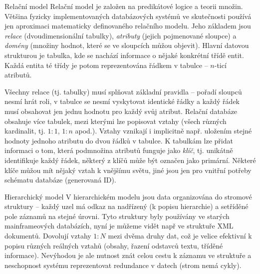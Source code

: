 \begin{obecne}{Relační model}
Relační model je založen na predikátové logice a teorii množin. Většina fyzicky implementovaných databázových systémů ve skutečnosti používá jen aproximaci matematicky definovaného relačního modelu. Jeho základem jsou \emph{relace} (dvoudimensionální tabulky), \emph{atributy} (jejich pojmenované sloupce) a \emph{domény} (množiny hodnot, které se ve sloupcích můžou objevit). Hlavní datovou strukturou je tabulka, kde se nachází informace o nějaké konkrétní  třídě entit. Každá entita té třídy je potom reprezentována řádkem v tabulce -- $n$-ticí atributů.

Všechny relace (tj. tabulky) musí splňovat základní pravidla -- pořadí sloupců nesmí hrát roli, v tabulce se nesmí vyskytovat identické řádky a každý řádek musí obsahovat jen jednu hodnotu pro každý svůj atribut. Relační databáze obsahuje více tabulek, mezi kterými lze popisovat vztahy (všech různých kardinalit, tj. $1:1$, $1:n$ apod.). Vztahy vznikají i implicitně např. uložením stejné hodnoty jednoho atributu do dvou řádků v tabulce. K tabulkám lze přidat informaci o tom, která podmnožina atributů funguje jako \emph{klíč}, tj. unikátně identifikuje každý řádek, některý z klíčů může být označen jako primární. Některé klíče můžou mít nějaký vztah k vnějšímu světu, jiné jsou jen pro vnitřní potřeby schématu databáze (generovaná ID).
\end{obecne}

\begin{obecne}{Hierarchický model}
V hierarchickém modelu jsou data organizována do stromové struktury -- každý uzel má odkaz na nadřízený (k popisu hierarchie) a setříděné pole záznamů na stejné úrovni. Tyto struktury byly používány ve starých mainframeových databázích, nyní je můžeme vidět např ve struktuře XML dokumentů. Dovolují vztahy $1:N$ mezi dvěma druhy dat, což je velice efektivní k popisu různých reálných vztahů (obsahy, řazení odstavců textu, tříděné informace). Nevýhodou je ale nutnost znát celou cestu k záznamu ve struktuře a neschopnost systému reprezentovat redundance v datech (strom nemá cykly).
\end{obecne}

